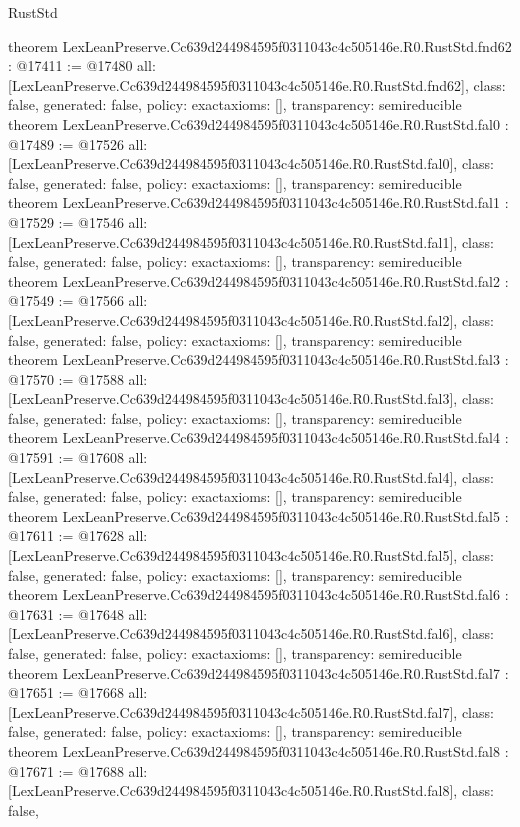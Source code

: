 \begin{lexlean}{RustStd}
\begin{coremodule}
{}
theorem LexLeanPreserve.Cc639d244984595f0311043c4c505146e.R0.RustStd.fnd62 : @17411 := @17480 {
  all: [LexLeanPreserve.Cc639d244984595f0311043c4c505146e.R0.RustStd.fnd62],
  class: false,
  generated: false,
  policy: exact{axioms: []},
  transparency: semireducible
}
theorem LexLeanPreserve.Cc639d244984595f0311043c4c505146e.R0.RustStd.fal0 : @17489 := @17526 {
  all: [LexLeanPreserve.Cc639d244984595f0311043c4c505146e.R0.RustStd.fal0],
  class: false,
  generated: false,
  policy: exact{axioms: []},
  transparency: semireducible
}
theorem LexLeanPreserve.Cc639d244984595f0311043c4c505146e.R0.RustStd.fal1 : @17529 := @17546 {
  all: [LexLeanPreserve.Cc639d244984595f0311043c4c505146e.R0.RustStd.fal1],
  class: false,
  generated: false,
  policy: exact{axioms: []},
  transparency: semireducible
}
theorem LexLeanPreserve.Cc639d244984595f0311043c4c505146e.R0.RustStd.fal2 : @17549 := @17566 {
  all: [LexLeanPreserve.Cc639d244984595f0311043c4c505146e.R0.RustStd.fal2],
  class: false,
  generated: false,
  policy: exact{axioms: []},
  transparency: semireducible
}
theorem LexLeanPreserve.Cc639d244984595f0311043c4c505146e.R0.RustStd.fal3 : @17570 := @17588 {
  all: [LexLeanPreserve.Cc639d244984595f0311043c4c505146e.R0.RustStd.fal3],
  class: false,
  generated: false,
  policy: exact{axioms: []},
  transparency: semireducible
}
theorem LexLeanPreserve.Cc639d244984595f0311043c4c505146e.R0.RustStd.fal4 : @17591 := @17608 {
  all: [LexLeanPreserve.Cc639d244984595f0311043c4c505146e.R0.RustStd.fal4],
  class: false,
  generated: false,
  policy: exact{axioms: []},
  transparency: semireducible
}
theorem LexLeanPreserve.Cc639d244984595f0311043c4c505146e.R0.RustStd.fal5 : @17611 := @17628 {
  all: [LexLeanPreserve.Cc639d244984595f0311043c4c505146e.R0.RustStd.fal5],
  class: false,
  generated: false,
  policy: exact{axioms: []},
  transparency: semireducible
}
theorem LexLeanPreserve.Cc639d244984595f0311043c4c505146e.R0.RustStd.fal6 : @17631 := @17648 {
  all: [LexLeanPreserve.Cc639d244984595f0311043c4c505146e.R0.RustStd.fal6],
  class: false,
  generated: false,
  policy: exact{axioms: []},
  transparency: semireducible
}
theorem LexLeanPreserve.Cc639d244984595f0311043c4c505146e.R0.RustStd.fal7 : @17651 := @17668 {
  all: [LexLeanPreserve.Cc639d244984595f0311043c4c505146e.R0.RustStd.fal7],
  class: false,
  generated: false,
  policy: exact{axioms: []},
  transparency: semireducible
}
theorem LexLeanPreserve.Cc639d244984595f0311043c4c505146e.R0.RustStd.fal8 : @17671 := @17688 {
  all: [LexLeanPreserve.Cc639d244984595f0311043c4c505146e.R0.RustStd.fal8],
  class: false,
}
\end{coremodule}
\end{lexlean}
